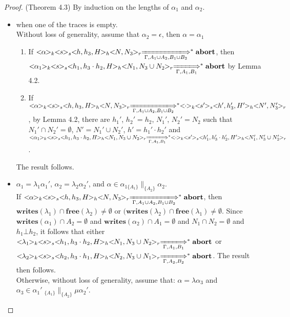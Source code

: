 \documentclass{lmcs} %
\theoremstyle{plain}\newtheorem{satz}[thm]{Satz} %
\begin{document}
\begin{proof}{(Theorem 4.3)}
By induction on the lengths of $\alpha_1$ and $\alpha_2$.
\begin{itemize}
  \item when one of the traces is empty.\\
  Without loss of generality, assume that $\alpha_2=\epsilon$, then $\alpha=\alpha_1$
  \begin{enumerate}
    \item If $<\!\!\alpha\!\!>_k<\!\!s\!\!>_s<\!\!h,h_3,H\!\!>_h<\!\!N,N_3\!\!>_r\xLongrightarrow[\Gamma, A_1\cup A_2, B_1\cup B_2]{}^*\mathbf{abort}$, then $<\!\!\alpha_1\!\!>_k<\!\!s\!\!>_s<\!\!h_1,h_3\cdot h_2,H\!\!>_h<\!\!N_1,N_3\cup N_2\!\!>_r\xLongrightarrow[\Gamma, A_1,B_1]{}^*\mathbf{abort}$ by Lemma 4.2.
    \item If $<\!\!\alpha\!\!>_k<\!\!s\!\!>_s<\!\!h,h_3,H\!\!>_h<\!\!N,N_3\!\!>_r\xLongrightarrow[\Gamma, A_1\cup A_2, B_1\cup B_2]{}^*<\!\!\cdot\!\!>_k<\!\!s'\!\!>_s<\!\!h',h_3',H'\!\!>_h<\!\!N',N_3'\!\!>_r$, by Lemma 4.2, there are $h_1'$, $h_2'=h_2$, $N_1'$, $N_2'=N_2$ such that $N_1'\cap N_2'=\emptyset$, $N'=N_1'\cup N_2'$, $h'=h_1'\cdot h_2'$ and $<\!\!\alpha_1\!\!>_k<\!\!s\!\!>_s<\!\!h_1,h_3\cdot h_2,H\!\!>_h<\!\!N_1,N_3\cup N_2\!\!>_r\xLongrightarrow[\Gamma, A_1, B_1]{}^*<\!\!\cdot\!\!>_k<\!\!s'\!\!>_s<\!\!h_1',h_3'\cdot h_2',H'\!\!>_h<\!\!N_1',N_3'\cup N_2'\!\!>_r$.
  \end{enumerate}
  The result follows.
  \item $\alpha_1=\lambda_1\alpha_1'$, $\alpha_2=\lambda_2\alpha_2'$, and $\alpha\in \alpha_{1\{A_1\}}\|_{\{A_2\}}\alpha_2$.\\
  If $<\!\!\alpha\!\!>_k<\!\!s\!\!>_s<\!\!h,h_3,H\!\!>_h<\!\!N,N_3\!\!>_r\xLongrightarrow[\Gamma, A_1\cup A_2, B_1\cup B_2]{}^*\mathbf{abort}$, then $\mathbf{writes}(\lambda_1)\cap \mathbf{free}(\lambda_2)\neq\emptyset$ or
    $(\mathbf{writes}(\lambda_2)\cap \mathbf{free}(\lambda_1)\neq\emptyset$.
    Since $\mathbf{writes}(\alpha_1)\cap A_2=\emptyset$ and $\mathbf{writes}(\alpha_2)\cap A_1=\emptyset$ and $N_1\cap N_2=\emptyset$ and $h_1\bot h_2$, it follows that either $<\!\!\lambda_1\!\!>_k<\!\!s\!\!>_s<\!\!h_1,h_3\cdot h_2,H\!\!>_h<\!\!N_1,N_3\cup N_2\!\!>_r\xLongrightarrow[\Gamma, A_1,B_1]{}^*\mathbf{abort}$ or $<\!\!\lambda_2\!\!>_k<\!\!s\!\!>_s<\!\!h_2,h_3\cdot h_1,H\!\!>_h<\!\!N_2,N_3\cup N_1\!\!>_r\xLongrightarrow[\Gamma, A_2, B_2]{}^*\mathbf{abort}$. The result then follows.\\
    Otherwise, without loss of generality, assume that: $\alpha=\lambda\alpha_3$ and  $\alpha_3\in\alpha_{1}'\;_{\{A_1\}}\|_{\{A_2\}}\mu\alpha_2'$.

\end{itemize}
\end{proof}
\end{document}
